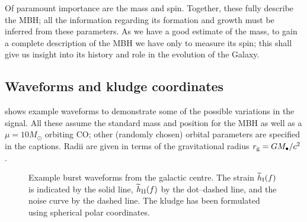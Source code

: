 Of paramount importance are the mass and spin. Together, these fully describe the MBH; all the information regarding its formation and growth must be inferred from these parameters. As we have a good estimate of the mass, to gain a complete description of the MBH we have only to measure its spin; this shall give us insight into its history and role in the evolution of the Galaxy.

\subsection{Waveforms and kludge coordinates}\label{sec:wave-ex}

 shows example waveforms to demonstrate some of the possible variations in the signal. All these assume the standard mass and position for the MBH as well as a $\mu = 10 M_\odot$ orbiting CO; other (randomly chosen) orbital parameters are specified in the captions. Radii are given in terms of the gravitational radius $r_\mathrm{g} = GM_\bullet / c^2$.
\begin{figure}%
  \centering
    \quad
\caption{Example burst waveforms from the galactic centre. The strain $\widetilde{h}_\mathrm{I}(f)$ is indicated by the solid line, $\widetilde{h}_\mathrm{II}(f)$ by the dot--dashed line, and the noise curve by the dashed line. The kludge has been formulated using spherical polar coordinates.}
  \label{fig:Examples}
\end{figure}

